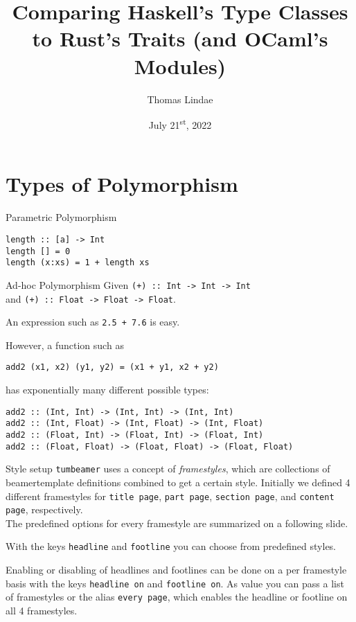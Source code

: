 \documentclass[
  english,            %
  aspectratio=169,    %
]{tumbeamer}
\title[Comparing Type Classes and Traits]{Comparing Haskell's Type Classes to Rust's Traits (and OCaml's Modules)}
\subtitle{}
\author{Thomas Lindae}
\institute{\theChairName\\\theDepartmentName\\\theUniversityName}
\date[2022-07-21]{July 21\textsuperscript{st}, 2022}
\begin{document}
\maketitle

\section{Types of Polymorphism}
\begin{frame}[fragile]{Parametric Polymorphism}
\begin{verbatim}
length :: [a] -> Int
length [] = 0
length (x:xs) = 1 + length xs
\end{verbatim}
\end{frame}

\begin{frame}[fragile]{Ad-hoc Polymorphism}
Given \texttt{(+) :: Int -> Int -> Int} \\ and \texttt{(+) :: Float -> Float -> Float}. \pause \vspace{3mm}

An expression such as \texttt{2.5 + 7.6} is easy. \pause \vspace{3mm}

However, a function such as
\begin{verbatim}
add2 (x1, x2) (y1, y2) = (x1 + y1, x2 + y2)
\end{verbatim}
\pause has exponentially many different possible types: \vspace{3mm}

\begin{verbatim}
add2 :: (Int, Int) -> (Int, Int) -> (Int, Int)
add2 :: (Int, Float) -> (Int, Float) -> (Int, Float)
add2 :: (Float, Int) -> (Float, Int) -> (Float, Int)
add2 :: (Float, Float) -> (Float, Float) -> (Float, Float)
\end{verbatim}
\end{frame}

\begin{frame}{Style setup}
  \texttt{tumbeamer} uses a concept of \textit{framestyles}, which are
  collections of beamertemplate definitions combined to get a certain style.
  Initially we defined 4 different framestyles for \texttt{title page},
  \texttt{part page}, \texttt{section page}, and \texttt{content page},
  respectively. \\
  The predefined options for every framestyle are summarized on a following
  slide. \\\vspace{3mm}

  With the keys \texttt{headline} and \texttt{footline} you can choose from
  predefined styles.

  Enabling or disabling of headlines and footlines can be done on a per
  framestyle basis with the keys \texttt{headline on} and
  \texttt{footline on}. As value you can pass a list of framestyles or the
  alias \texttt{every page}, which enables the headline or footline on all 4
  framestyles.
\end{frame}
\end{document}
